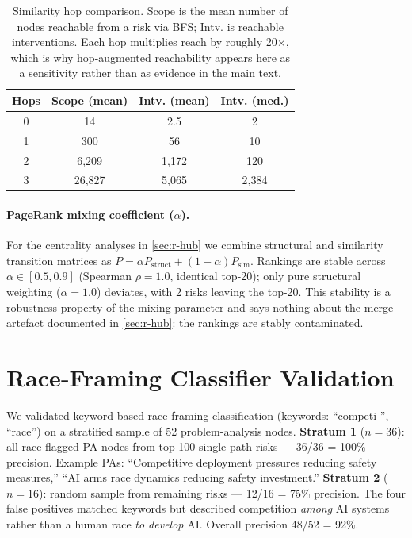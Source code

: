 \documentclass[10pt,twocolumn,letterpaper]{article}
\begin{document}
\begin{table}[h]
\centering
\footnotesize
\begin{tabular}{cccc}
\toprule
\textbf{Hops} & \textbf{Scope (mean)} & \textbf{Intv. (mean)} & \textbf{Intv. (med.)} \\
\midrule
0 & 14 & 2.5 & 2 \\
1 & 300 & 56 & 10 \\
2 & 6,209 & 1,172 & 120 \\
3 & 26,827 & 5,065 & 2,384 \\
\bottomrule
\end{tabular}
\caption{Similarity hop comparison. Scope is the mean number of nodes reachable from a
risk via BFS; Intv. is reachable interventions. Each hop multiplies reach by roughly
20$\times$, which is why hop-augmented reachability appears here as a sensitivity rather
than as evidence in the main text.}
\label{tab:sim-hops}
\end{table}

\paragraph{PageRank mixing coefficient ($\alpha$).} For the centrality analyses in
\cref{sec:r-hub} we combine structural and similarity transition matrices as
$P = \alpha P_{\text{struct}} + (1-\alpha) P_{\text{sim}}$. Rankings are stable across
$\alpha \in [0.5, 0.9]$ (Spearman $\rho = 1.0$, identical top-20); only pure structural
weighting ($\alpha = 1.0$) deviates, with 2 risks leaving the top-20. This stability is a
robustness property of the mixing parameter and says nothing about the merge artefact
documented in \cref{sec:r-hub}: the rankings are stably contaminated.

\section{Race-Framing Classifier Validation}
\label{app:race}

We validated keyword-based race-framing classification (keywords: ``competi-'',
``race'') on a stratified sample of 52 problem-analysis nodes. \textbf{Stratum 1}
($n{=}36$): all race-flagged PA nodes from top-100 single-path risks --- 36/36 = 100\%
precision. Example PAs: ``Competitive deployment pressures reducing safety measures,''
``AI arms race dynamics reducing safety investment.'' \textbf{Stratum 2} ($n{=}16$):
random sample from remaining risks --- 12/16 = 75\% precision. The four false positives
matched keywords but described competition \emph{among} AI systems rather than a human
race \emph{to develop} AI. Overall precision 48/52 = 92\%.
\end{document}
